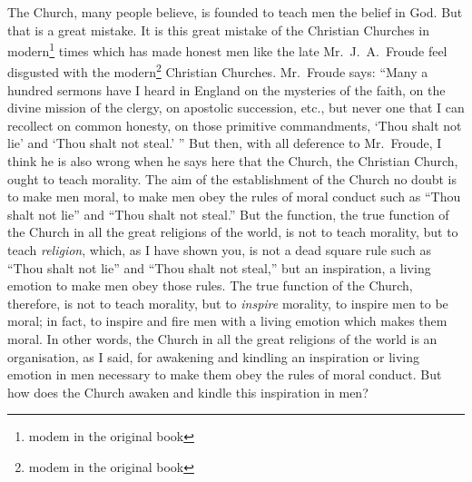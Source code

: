 The Church, many people believe, is founded to teach men the belief in God.
But that is a great mistake.
It is this great mistake of the Christian Churches in modern\footnote{modem in the original book} times which has made honest men like the late Mr.~J.~A.~Froude feel disgusted with the modern\footnote{modem in the original book} Christian Churches.
Mr.~Froude says: ``Many a hundred sermons have I heard in England on the mysteries of the faith, on the divine mission of the clergy, on apostolic succession, etc., but never one that I can recollect on common honesty, on those primitive commandments, `Thou shalt not lie' and `Thou shalt not steal.' ''
But then, with all deference to Mr.~Froude, I think he is also wrong when he says here that the Church, the Christian Church, ought to teach morality.
The aim of the establishment of the Church no doubt is to make men moral, to make men obey the rules of moral conduct such as ``Thou shalt not lie'' and ``Thou shalt not steal.''
But the function, the true function of the Church in all the great religions of the world, is not to teach morality, but to teach \emph{religion}, which, as I have shown you, is not a dead square rule such as ``Thou shalt not lie'' and ``Thou shalt not steal,'' but an inspiration, a living emotion to make men obey those rules.
The true function of the Church, therefore, is not to teach morality, but to \emph{inspire} morality, to inspire men to be moral;
in fact, to inspire and fire men with a living emotion which makes them moral.
In other words, the Church in all the great religions of the world is an organisation, as I said, for awakening and kindling an inspiration or living emotion in men necessary to make them obey the rules of moral conduct.
But how does the Church awaken and kindle this inspiration in men?


